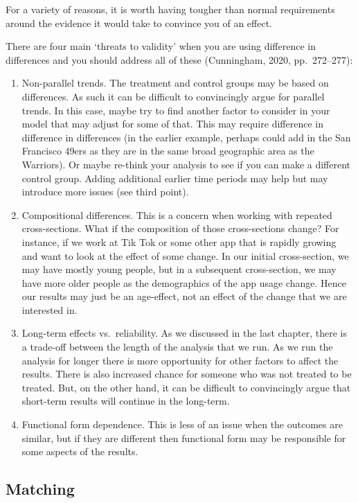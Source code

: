 \documentclass[
]{book}
\providecommand{\tightlist}{%
  \setlength{\itemsep}{0pt}\setlength{\parskip}{0pt}}
\begin{document}
For a variety of reasons, it is worth having tougher than normal requirements around the evidence it would take to convince you of an effect.

There are four main `threats to validity' when you are using difference in differences and you should address all of these (Cunningham, 2020, pp.~272--277):

\begin{enumerate}
\def\labelenumi{\arabic{enumi}.}
\tightlist
\item
  Non-parallel trends. The treatment and control groups may be based on differences. As such it can be difficult to convincingly argue for parallel trends. In this case, maybe try to find another factor to consider in your model that may adjust for some of that. This may require difference in difference in differences (in the earlier example, perhaps could add in the San Francisco 49ers as they are in the same broad geographic area as the Warriors). Or maybe re-think your analysis to see if you can make a different control group. Adding additional earlier time periods may help but may introduce more issues (see third point).
\item
  Compositional differences. This is a concern when working with repeated cross-sections. What if the composition of those cross-sections change? For instance, if we work at Tik Tok or some other app that is rapidly growing and want to look at the effect of some change. In our initial cross-section, we may have mostly young people, but in a subsequent cross-section, we may have more older people as the demographics of the app usage change. Hence our results may just be an age-effect, not an effect of the change that we are interested in.
\item
  Long-term effects vs.~reliability. As we discussed in the last chapter, there is a trade-off between the length of the analysis that we run. As we run the analysis for longer there is more opportunity for other factors to affect the results. There is also increased chance for someone who was not treated to be treated. But, on the other hand, it can be difficult to convincingly argue that short-term results will continue in the long-term.
\item
  Functional form dependence. This is less of an issue when the outcomes are similar, but if they are different then functional form may be responsible for some aspects of the results.
\end{enumerate}

\hypertarget{matching}{%
\subsection{Matching}\label{matching}}
\end{document}
